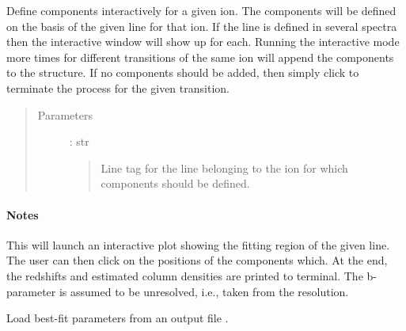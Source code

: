 \documentclass[letterpaper,10pt,english]{sphinxmanual}
\begin{document}
\begin{fulllineitems}
\begin{fulllineitems}
\label{\detokenize{api:VoigtFit.DataSet.interactive_components}}
Define components interactively for a given ion. The components will be defined on the
basis of the given line for that ion. If the line is defined in several spectra
then the interactive window will show up for each.
Running the interactive mode more times for different transitions of the same ion
will append the components to the structure.
If no components should be added, then simply click  to terminate the process
for the given transition.
\begin{quote}\begin{description}
\item[{Parameters}] \leavevmode
{} : str
\begin{quote}

Line tag for the line belonging to the ion for which components should be defined.
\end{quote}

\end{description}\end{quote}
\paragraph{Notes}

This will launch an interactive plot showing the fitting region of the given line.
The user can then click on the positions of the components which. At the end, the
redshifts and estimated column densities are printed to terminal. The b-parameter
is assumed to be unresolved, i.e., taken from the resolution.

\end{fulllineitems}


\begin{fulllineitems}
\label{\detokenize{api:VoigtFit.DataSet.load_components_from_file}}
Load best-fit parameters from an output file .

\end{fulllineitems}



\end{fulllineitems}
\end{document}
